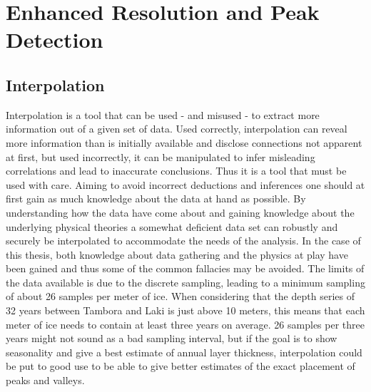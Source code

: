 \documentclass[../../CompleteThesis/Complete_1stDraft]{subfiles}
\begin{document}
\section[Peak Detection][Peak Detection]{Enhanced Resolution and Peak Detection}

\subsection[Interpolation][Interpolation]{Interpolation}
Interpolation is a tool that can be used - and misused - to extract more information out of a given set of data. Used correctly, interpolation can reveal more information than is initially available and disclose connections not apparent at first, but used incorrectly, it can be manipulated to infer misleading correlations and lead to inaccurate conclusions. Thus it is a tool that must be used with care. Aiming to avoid incorrect deductions and inferences one should at first gain as much knowledge about the data at hand as possible. By understanding how the data have come about and gaining knowledge about the underlying physical theories a somewhat deficient data set can robustly and securely be interpolated to accommodate the needs of the analysis. In the case of this thesis, both knowledge about data gathering and the physics at play have been gained and thus some of the common fallacies may be avoided. The limits of the data available is due to the discrete sampling, leading to a minimum sampling of about 26 samples per meter of ice.
When considering that the depth series of 32 years between Tambora and Laki is just above 10 meters, this means that each meter of ice needs to contain at least three years on average. 26 samples per three years might not sound as a bad sampling interval, but if the goal is to show seasonality and give a best estimate of annual layer thickness, interpolation could be put to good use to be able to give better estimates of the exact placement of peaks and valleys.\\
\end{document}
